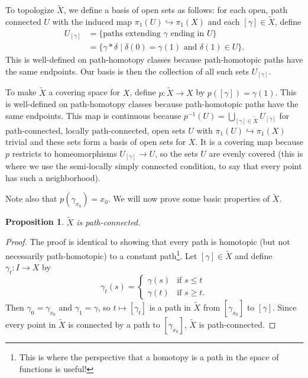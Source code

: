 \documentclass{article}
\newtheorem{prop}[thm]{Proposition}
\theoremstyle{definition}
\theoremstyle{remark}
\numberwithin{figure}{section}
\begin{document}
To topologize $\tilde X$, we define a basis of open sets as follows: for each open, path connected $U$ with the induced map $\pi_1(U) \hookrightarrow \pi_1(X)$ and each $[\gamma] \in \tilde X$, define
\begin{align*}
	U_{[\gamma]} &= \{ \text{paths extending $\gamma$ ending in $U$} \}\\
	&= \{ \gamma * \delta \mid \delta(0) = \gamma(1) \text{ and } \delta(1) \in U \}.
\end{align*}
This is well-defined on path-homotopy classes because path-homotopic paths have the same endpoints. Our basis is then the collection of all such sets $U_{[\gamma]}$.

To make $\tilde X$ a covering space for $X$, define $p : \tilde X \to X$ by $p([\gamma]) = \gamma(1)$. This is well-defined on path-homotopy classes because path-homotopic paths have the same endpoints. This map is continuous because $p^{-1}(U) = \bigcup_{[\gamma] \in \tilde X} U_{[\gamma]}$ for path-connected, locally path-connected, open sets $U$ with $\pi_1(U) \hookrightarrow \pi_1(X)$ trivial and these sets form a basis of open sets for $X$. It is a covering map because $p$ restricts to homeomorphisms $U_{[\gamma]} \to U$, so the sets $U$ are evenly covered (this is where we use the semi-locally simply connected condition, to say that every point has such a neighborhood).

Note also that $p(\gamma_{x_0}) = x_0$. We will now prove some basic properties of $\tilde X$.

\begin{prop}\label{prop:universal path connected}
	$\tilde X$ is path-connected.
\end{prop}

\begin{proof}
	The proof is identical to showing that every path is homotopic (but not necessarily path-homotopic) to a constant path\footnote{This is where the perspective that a homotopy is a path in the space of functions is useful!}. Let $[\gamma] \in \tilde X$ and define $\gamma_t : I \to X$ by
	\[
	\gamma_t(s) = \begin{cases}
		\gamma(s) & \text{if } s \leq t\\
		\gamma(t) & \text{if } s \geq t.
	\end{cases}
	\]
	Then $\gamma_0 = \gamma_{x_0}$ and $\gamma_1 = \gamma$, so $t \mapsto [\gamma_t]$ is a path in $\tilde X$ from $[\gamma_{x_0}]$ to $[\gamma]$. Since every point in $\tilde X$ is connected by a path to $[\gamma_{x_0}]$, $\tilde X$ is path-connected.
\end{proof}
\end{document}
